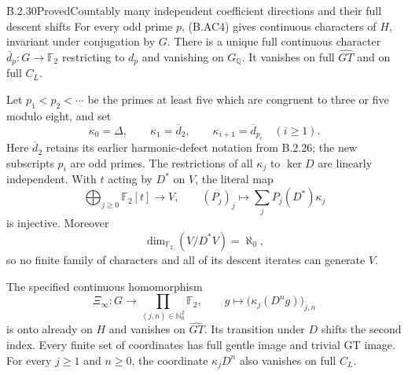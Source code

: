 \begin{result}{B.2.30}{Proved}{Countably many independent coefficient directions and their full descent shifts}
For every odd prime $p$, (B.AC4) gives continuous
characters of $H$, invariant under conjugation by $G$.
There is a unique full continuous character
$\overline d_p:G\to\mathbb F_2$ restricting to $d_p$
and vanishing on $G_{\mathbb Q}$.  It vanishes on
full $\widehat{GT}$ and on full $C_L$.

Let $p_1<p_2<\cdots$ be the primes at least five which
are congruent to three or five modulo eight, and set
\[
 \kappa_0=\Delta,\qquad
 \kappa_1=\overline d_2,\qquad
               \kappa_{i+1}=\overline d_{p_i}\quad(i\geq1).
 \tag{B.AC5}
\]
Here $\overline d_2$ retains its earlier harmonic-defect
notation from B.2.26; the new subscripts $p_i$ are odd primes.
The restrictions of all $\kappa_j$ to $\ker D$ are
linearly independent.  With $t$ acting by $D^*$ on $V$,
the literal map
\[
 \bigoplus_{j\geq0}\mathbb F_2[t]\longrightarrow V,
               \qquad(P_j)_j\longmapsto
                         \sum_j P_j(D^*)\kappa_j
 \tag{B.AC6}
\]
is injective.  Moreover
\[
 \dim_{\mathbb F_2}(V/D^*V)=\aleph_0,
 \tag{B.AC7}
\]
so no finite family of characters and all of its descent
iterates can generate $V$.

The specified continuous homomorphism
\[
 \Xi_\infty:G\longrightarrow
             \prod_{(j,n)\in\mathbb N_0^2}\mathbb F_2,\qquad
 g\longmapsto\bigl(\kappa_j(D^ng)\bigr)_{j,n}
 \tag{B.AC8}
\]
is onto already on $H$ and vanishes on $\widehat{GT}$.
Its transition under $D$ shifts the second index.
Every finite set of coordinates has full gentle image
and trivial GT image.  For every $j\geq1$ and $n\geq0$,
the coordinate $\kappa_jD^n$ also vanishes on full $C_L$.
\end{result}
